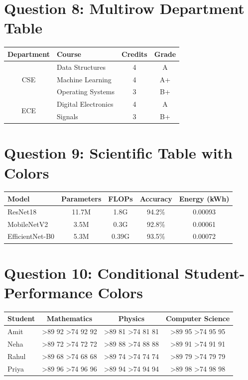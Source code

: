 \documentclass[11pt,a4paper]{article}
\newcommand{\markcell}[1]{%
  \ifnum#1>89
    \cellcolor{lightgreen}#1%
  \else
    \ifnum#1>74
      \cellcolor{lightyellow}#1%
    \else
      \cellcolor{lightred}#1%
    \fi
  \fi
}
\begin{document}
\section*{Question 8: Multirow Department Table}
\begin{center}
\begin{tabular}{|c|l|c|c|}
\hline
\textbf{Department}&\textbf{Course}&\textbf{Credits}&\textbf{Grade}\\ \hline
\multirow{3}{*}{CSE}
&Data Structures&4&A\\
&Machine Learning&4&A+\\
&Operating Systems&3&B+\\ \hline
\multirow{2}{*}{ECE}
&Digital Electronics&4&A\\
&Signals&3&B+\\ \hline
\end{tabular}
\end{center}

\section*{Question 9: Scientific Table with Colors}
\begin{center}
\begin{tabular}{|l|c|c|c|c|}
\hline
\rowcolor{headerblue}
\color{white}\textbf{Model}&
\color{white}\textbf{Parameters}&
\color{white}\textbf{FLOPs}&
\color{white}\textbf{Accuracy}&
\color{white}\textbf{Energy (kWh)}\\ \hline
\rowcolor{lightblue}
ResNet18&11.7M&1.8G&94.2\%&0.00093\\ \hline
MobileNetV2&3.5M&0.3G&92.8\%&0.00061\\ \hline
\rowcolor{lightblue}
EfficientNet-B0&5.3M&0.39G&93.5\%&0.00072\\ \hline
\end{tabular}
\end{center}

\section*{Question 10: Conditional Student-Performance Colors}
\begin{center}
\begin{tabular}{|l|c|c|c|}
\hline
\rowcolor{headerblue}
\color{white}\textbf{Student}&
\color{white}\textbf{Mathematics}&
\color{white}\textbf{Physics}&
\color{white}\textbf{Computer Science}\\ \hline
Amit&\markcell{92}&\markcell{81}&\markcell{95}\\ \hline
Neha&\markcell{72}&\markcell{88}&\markcell{91}\\ \hline
Rahul&\markcell{68}&\markcell{74}&\markcell{79}\\ \hline
Priya&\markcell{96}&\markcell{94}&\markcell{98}\\ \hline
\end{tabular}
\end{center}
\end{document}
